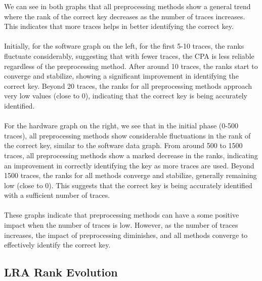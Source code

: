 \documentclass[a4paper,10pt]{article}
\begin{document}
We can see in both graphs that all preprocessing methods show a general trend where the rank of the correct key decreases as the number of traces increases. 
This indicates that more traces helps in better identifying the correct key.
\\ \\
Initially, for the software graph on the left, for the first 5-10 traces, the ranks fluctuate considerably, suggesting that with fewer traces, the CPA is less reliable regardless of the preprocessing method.
After around 10 traces, the ranks start to converge and stabilize, showing a significant improvement in identifying the correct key.
Beyond 20 traces, the ranks for all preprocessing methods approach very low values (close to 0), indicating that the correct key is being accurately identified.
\\ \\
For the hardware graph on the right, we see that in the initial phase (0-500 traces), all preprocessing methods show considerable fluctuations in the rank of the correct key, similar to the software data graph.
From around 500 to 1500 traces, all preprocessing methods show a marked decrease in the ranks, indicating an improvement in correctly identifying the key as more traces are used.
Beyond 1500 traces, the ranks for all methods converge and stabilize, generally remaining low (close to 0). This suggests that the correct key is being accurately identified with a sufficient number of traces.
\\ \\
These graphs indicate that preprocessing methods can have a some positive impact when the number of traces is low. 
However, as the number of traces increases, the impact of preprocessing diminishes, and all methods converge to effectively identify the correct key.
\subsection{LRA Rank Evolution}
\end{document}
